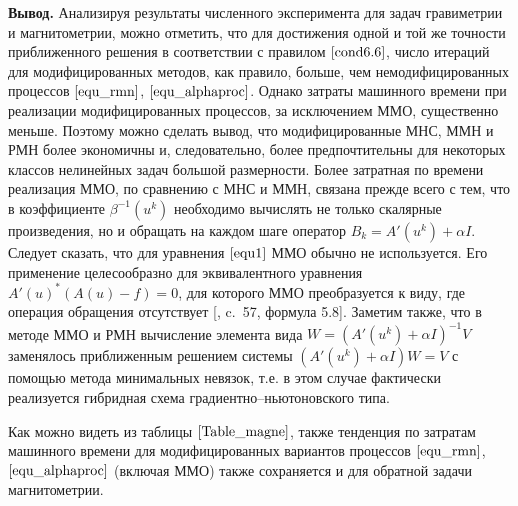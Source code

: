 {\bfseries\large Вывод.} Анализируя результаты численного эксперимента для задач гравиметрии и магнитометрии, можно отметить, что для достижения одной и той же точности приближенного решения в соответствии с правилом $\eqref{cond6.6}$, число итераций для модифицированных методов, как правило, больше, чем немодифицированных процессов $\eqref{equ_rmn}$, $\eqref{equ_alphaproc}$. Однако затраты машинного времени при реализации модифицированных процессов, за исключением ММО, существенно меньше. Поэтому можно сделать вывод, что модифицированные МНС, ММН и РМН более экономичны и, следовательно, более предпочтительны для некоторых классов нелинейных задач большой размерности. Более затратная по времени реализация ММО, по сравнению с МНС и ММН, связана прежде всего с тем, что в коэффициенте $\beta^{-1}(u^k)$ необходимо вычислять не только скалярные произведения, но и обращать на каждом шаге оператор $B_k=A'(u^k)+\alpha I$. Следует сказать, что для уравнения $\eqref{equ1}$ ММО обычно не используется. Его применение целесообразно для эквивалентного уравнения $A'(u)^*(A(u)-f)=0$, для которого ММО преобразуется к виду, где операция обращения отсутствует [\cite{VasEre2009},	c.~57, формула 5.8]. Заметим также, что в методе ММО и РМН вычисление элемента вида $W=(A'(u^k)+\alpha I)^{-1}V$ заменялось приближенным решением системы $(A'(u^k)+\alpha I)W=V$ с помощью метода минимальных невязок, т.е. в этом случае фактически реализуется гибридная схема градиентно--ньютоновского типа. 

Как можно видеть из таблицы $\ref{Table_magne}$, также тенденция по затратам машинного времени для модифицированных вариантов процессов $\eqref{equ_rmn}$, $\eqref{equ_alphaproc}$ (включая ММО) также сохраняется и для обратной задачи магнитометрии. 


